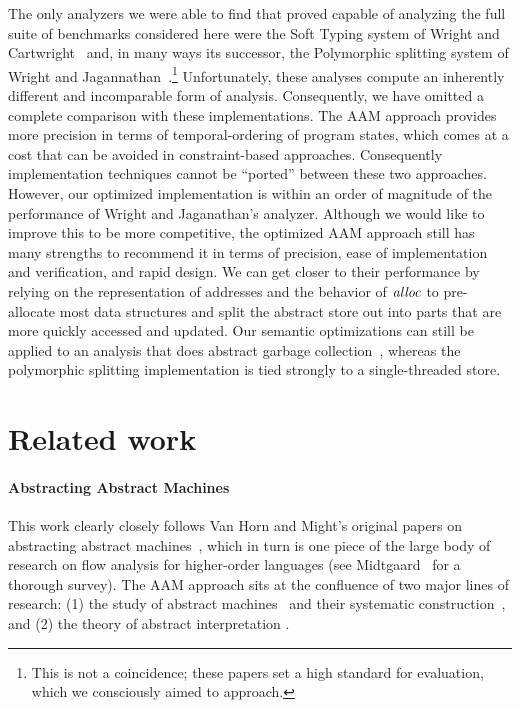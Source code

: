 \documentclass[preprint,onecolumn,9pt]{sigplanconf} %
\begin{document}
The only analyzers we were able to find that proved capable of
analyzing the full suite of benchmarks considered here were the Soft
Typing system of Wright and
Cartwright~\cite{dvanhorn:Wright1997Practical} and, in many ways its
successor, the Polymorphic splitting system of Wright and
Jagannathan~\cite{dvanhorn:wright-jagannathan-toplas98}.\footnote{This
  is not a coincidence; these papers set a high standard for
  evaluation, which we consciously aimed to approach.}  Unfortunately,
these analyses compute an inherently different and incomparable form
of analysis.  Consequently, we have omitted a complete comparison with
these implementations.  The AAM approach provides more precision in
terms of temporal-ordering of program states, which comes at a cost
that can be avoided in constraint-based approaches.  Consequently
implementation techniques cannot be ``ported'' between these two
approaches.  However, our optimized implementation is within an order
of magnitude of the performance of Wright and Jaganathan's analyzer.
Although we would like to improve this to be more competitive, the
optimized AAM approach still has many strengths to recommend it in
terms of precision, ease of implementation and verification, and rapid
design. We can get closer to their performance by relying on the
representation of addresses and the behavior of $\mathit{alloc}$ to
pre-allocate most data structures and split the abstract store out
into parts that are more quickly accessed and updated. Our semantic
optimizations can still be applied to an analysis that does abstract
garbage collection~\cite{dvanhorn:Might:2006:GammaCFA}, whereas the
polymorphic splitting implementation is tied strongly to a
single-threaded store.

\section{Related work}
\label{sec:related}

\paragraph{Abstracting Abstract Machines}

This work clearly closely follows Van Horn and Might's original papers
on abstracting abstract
machines~\cite{dvanhorn:VanHorn2011Abstracting,dvanhorn:VanHorn2012Systematic},
which in turn is one piece of the large body of research on flow
analysis for higher-order languages (see
Midtgaard~\cite{dvanhorn:Midtgaard2011Controlflow} for a thorough
survey).  The AAM approach sits at the confluence of two major lines
of research: (1) the study of abstract
machines~\cite{dvanhorn:landin-64} and their systematic
construction~\cite{dvanhorn:reynolds-hosc98}, and (2) the theory of
abstract interpretation
\cite{dvanhorn:Cousot:1977:AI,dvanhorn:Cousot1979Systematic}.
\end{document}
